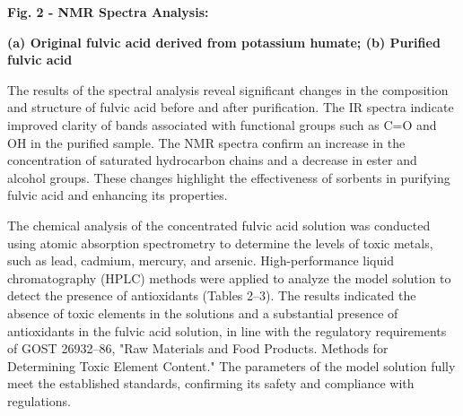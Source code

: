 % 
% 

{\bfseries Fig. 2 - NMR Spectra Analysis:}

{\bfseries (a) Original fulvic acid derived from potassium humate; (b)
Purified fulvic acid}

\begin{multicols}{2}
The results of the spectral analysis reveal significant changes in the
composition and structure of fulvic acid before and after purification.
The IR spectra indicate improved clarity of bands associated with
functional groups such as C=O and OH in the purified sample. The NMR
spectra confirm an increase in the concentration of saturated
hydrocarbon chains and a decrease in ester and alcohol groups. These
changes highlight the effectiveness of sorbents in purifying fulvic acid
and enhancing its properties.

The chemical analysis of the concentrated fulvic acid solution was
conducted using atomic absorption spectrometry to determine the levels
of toxic metals, such as lead, cadmium, mercury, and arsenic.
High-performance liquid chromatography (HPLC) methods were applied to
analyze the model solution to detect the presence of antioxidants
(Tables 2--3). The results indicated the absence of toxic elements in
the solutions and a substantial presence of antioxidants in the fulvic
acid solution, in line with the regulatory requirements of GOST
26932--86, "Raw Materials and Food Products. Methods for Determining
Toxic Element Content." The parameters of the model solution fully meet
the established standards, confirming its safety and compliance with
regulations.
\end{multicols}

